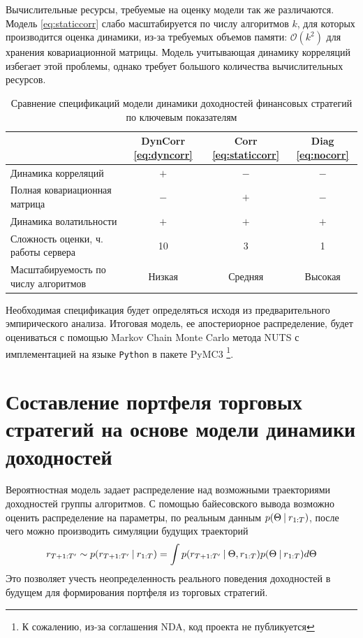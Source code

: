 Вычислительные ресурсы, требуемые на оценку модели так же различаются. Модель \eqref{eq:staticcorr} слабо масштабируется по числу алгоритмов $k$, для которых производится оценка динамики, из-за требуемых объемов памяти: $\mathcal{O}(k^2)$ для хранения ковариационной матрицы. Модель учитывающая динамику корреляций избегает этой проблемы, однако требует большого количества вычислительных ресурсов.
\begin{table}[h]
	\caption{Сравнение спецификаций модели динамики доходностей финансовых стратегий по ключевым показателям}
	\begin{tabular}{l|c|c|c}
		& DynCorr \eqref{eq:dyncorr} & Corr \eqref{eq:staticcorr}& Diag \eqref{eq:nocorr} \\ \hline
		Динамика корреляций & $+$ & $-$ & $-$ \\ \hline
		Полная ковариационная матрица &$-$ & $+$ & $-$ \\ \hline
		Динамика волатильности  &$+$ & $+$ & $+$ \\ \hline
		Сложность оценки, ч. работы сервера &10 & 3 & 1 \\ \hline
		Масштабируемость по числу алгоритмов & Низкая & Средняя & Высокая
	\end{tabular}
\end{table}

Необходимая спецификация будет определяться исходя из предварительного эмпирического анализа. Итоговая модель, ее апостериорное распределение, будет оцениваться с помощью Markov Chain Monte Carlo метода NUTS \citep{hoffman2011nuts} с имплементацией на языке \texttt{Python} в пакете PyMC3 \citep{salvatier2016pymc3}\footnote{К сожалению, из-за соглашения NDA, код проекта не публикуется}.

\section{Составление портфеля торговых стратегий на основе модели динамики доходностей}
Вероятностная модель задает распределение над возможными траекториями доходностей группы алгоритмов. С помощью байесовского вывода возможно оценить распределение на параметры, по реальным данным $p(\Theta\:|\: r_{1:T})$, после чего можно производить симуляции будущих траекторий 
\[r_{T+1:T'} \sim p(r_{T+1:T'}\:|\: r_{1:T}) = \int p(r_{T+1:T'}\:|\:\Theta, r_{1:T})p(\Theta\:|\: r_{1:T}) d\Theta\] 
Это позволяет учесть неопределенность реального поведения доходностей в будущем для формирования портфеля из торговых стратегий.

